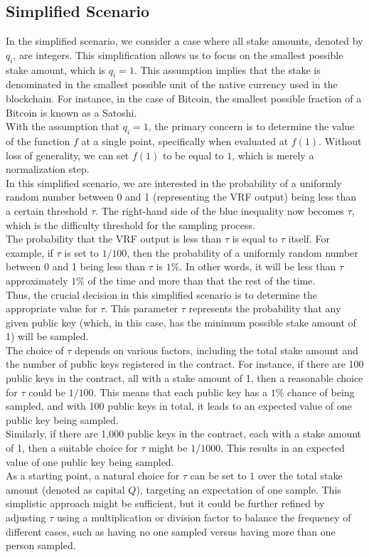 \subsection{Simplified Scenario}
In the simplified scenario, we consider a case where all stake amounts, denoted by $q_i$, are integers. This simplification allows us to focus on the smallest possible stake amount, which is $q_i = 1$. This assumption implies that the stake is denominated in the smallest possible unit of the native currency used in the blockchain. For instance, in the case of Bitcoin, the smallest possible fraction of a Bitcoin is known as a Satoshi.\\
With the assumption that $q_i = 1$, the primary concern is to determine the value of the function $f$ at a single point, specifically when evaluated at $f(1)$. Without loss of generality, we can set $f(1)$ to be equal to $1$, which is merely a normalization step.\\
In this simplified scenario, we are interested in the probability of a uniformly random number between 0 and 1 (representing the VRF output) being less than a certain threshold $\tau$. The right-hand side of the blue inequality now becomes $\tau$, which is the difficulty threshold for the sampling process.\\
The probability that the VRF output is less than $\tau$ is equal to $\tau$ itself. For example, if $\tau$ is set to $1/100$, then the probability of a uniformly random number between 0 and 1 being less than $\tau$ is $1\%$. In other words, it will be less than $\tau$ approximately $1\%$ of the time and more than that the rest of the time.\\
Thus, the crucial decision in this simplified scenario is to determine the appropriate value for $\tau$. This parameter $\tau$ represents the probability that any given public key (which, in this case, has the minimum possible stake amount of 1) will be sampled.\\
The choice of $\tau$ depends on various factors, including the total stake amount and the number of public keys registered in the contract. For instance, if there are 100 public keys in the contract, all with a stake amount of 1, then a reasonable choice for $\tau$ could be $1/100$. This means that each public key has a $1\%$ chance of being sampled, and with 100 public keys in total, it leads to an expected value of one public key being sampled.\\
Similarly, if there are 1,000 public keys in the contract, each with a stake amount of 1, then a suitable choice for $\tau$ might be $1/1000$. This results in an expected value of one public key being sampled.\\
As a starting point, a natural choice for $\tau$ can be set to $1$ over the total stake amount (denoted as $\text{capital }Q$), targeting an expectation of one sample. This simplistic approach might be sufficient, but it could be further refined by adjusting $\tau$ using a multiplication or division factor to balance the frequency of different cases, such as having no one sampled versus having more than one person sampled.

